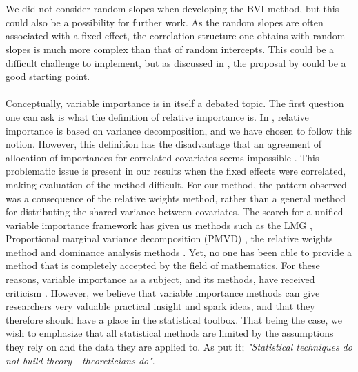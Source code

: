 \\
\\
We did not consider random slopes when developing the BVI method, but this could also be a possibility for further work. As the random slopes are often associated with a fixed effect, the correlation structure one obtains with random slopes is much more complex than that of random intercepts. This could be a difficult challenge to implement, but as discussed in , the proposal by \citet{Johnson2014} could be a good starting point.
\\
\\
Conceptually, variable importance is in itself a debated topic. The first question one can ask is what the definition of relative importance is. In \citet{gromping_relaimpo}, relative importance is based on variance decomposition, and we have chosen to follow this notion. However, this definition has the disadvantage that an agreement of allocation of importances for correlated covariates seems impossible \citep{Gromping_2015}. This problematic issue is present in our results when the fixed effects were correlated, making evaluation of the method difficult. For our method, the pattern observed was a consequence of the relative weights method, rather than a general method for distributing the shared variance between covariates. The search for a unified variable importance framework has given us methods such as the LMG \citep{gromping_relaimpo}, Proportional marginal variance decomposition (PMVD) \citep{gromping_relaimpo}, the relative weights method \citep{johnson_relative_weights} and dominance analysis methods \citep{budescu1993dominance}. Yet, no one has been able to provide a method that is completely accepted by the field of mathematics. For these reasons, variable importance as a subject, and its methods, have received criticism \citep{gromping_relaimpo}. However, we believe that variable importance methods can give researchers very valuable practical insight and spark ideas, and that they therefore should have a place in the statistical toolbox. That being the case, we wish to emphasize that all statistical methods are limited by the assumptions they rely on and the data they are applied to. As \citet{Sutherland_91} put it; \textit{"Statistical techniques do not build theory - theoreticians do"}.


